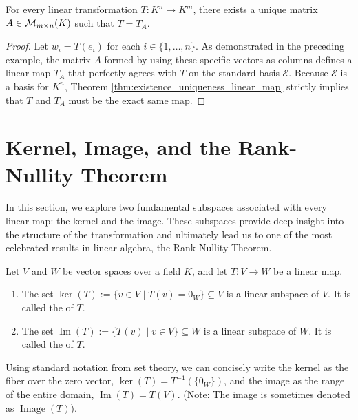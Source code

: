 \begin{lemma}
\label{lem:all_linear_maps_are_matrices}
For every linear transformation $T: K^n \to K^m$, there exists a unique matrix $A \in \mathcal{M}_{m \times n}(K)$ such that $T = T_A$.
\end{lemma}

\begin{proof}
Let $w_i = T(e_i)$ for each $i \in \{1, \dots, n\}$. As demonstrated in the preceding example, the matrix $A$ formed by using these specific vectors as columns defines a linear map $T_A$ that perfectly agrees with $T$ on the standard basis $\mathcal{E}$. Because $\mathcal{E}$ is a basis for $K^n$, Theorem \ref{thm:existence_uniqueness_linear_map} strictly implies that $T$ and $T_A$ must be the exact same map.
\end{proof}
\section{Kernel, Image, and the Rank-Nullity Theorem}

In this section, we explore two fundamental subspaces associated with every linear map: the kernel and the image. These subspaces provide deep insight into the structure of the transformation and ultimately lead us to one of the most celebrated results in linear algebra, the Rank-Nullity Theorem.

\begin{proposition}
\label{prop:kernel_image}
Let $V$ and $W$ be vector spaces over a field $K$, and let $T: V \to W$ be a linear map.
\begin{enumerate}
    \item The set $\ker(T) := \{v \in V \mid T(v) = 0_W\} \subseteq V$ is a linear subspace of $V$. It is called the  of $T$.
    \item The set $\operatorname{Im}(T) := \{T(v) \mid v \in V\} \subseteq W$ is a linear subspace of $W$. It is called the  of $T$.
\end{enumerate}
\end{proposition}

\begin{remark}
\label{rem:set_theoretic_notation}
Using standard notation from set theory, we can concisely write the kernel as the fiber over the zero vector, $\ker(T) = T^{-1}(\{0_W\})$, and the image as the range of the entire domain, $\operatorname{Im}(T) = T(V)$. (Note: The image is sometimes denoted as $\operatorname{Image}(T)$).
\end{remark}

